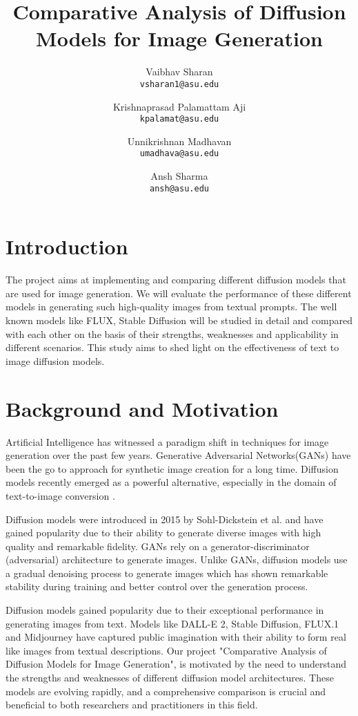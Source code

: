 \documentclass{article}
\title{Comparative Analysis of Diffusion Models for Image Generation
}
\author{
  Vaibhav Sharan\\
  \texttt{vsharan1@asu.edu} \\ 
  \and
  Krishnaprasad Palamattam Aji\\
  \texttt{kpalamat@asu.edu}\\
  \and
  Unnikrishnan Madhavan\\
  \texttt{umadhava@asu.edu}\\
  \and
  Ansh Sharma\\
  \texttt{ansh@asu.edu}
}
\begin{document}
\maketitle


\section{Introduction}
The project aims at implementing and comparing different diffusion models that are used for 
image generation. We will evaluate the performance of these different models in generating
such high-quality images from textual prompts. The well known models like FLUX, Stable
Diffusion will be studied in detail and compared with each other on the basis of
their strengths, weaknesses and applicability in different scenarios. This study aims to shed light
on the effectiveness of text to image diffusion models.


\section{Background and Motivation}
Artificial Intelligence has witnessed a paradigm shift in techniques for image generation over the past few years. 
Generative Adversarial Networks(GANs) have been the go to approach for synthetic image creation for a long time. 
Diffusion models recently emerged as a powerful alternative, especially in the domain of text-to-image conversion \cite{dhariwal2021}. 

Diffusion models were introduced in 2015 by Sohl-Dickstein et al.\cite{sohl2015} and have gained popularity 
due to their ability to generate diverse images with high quality and remarkable fidelity. GANs rely on a 
generator-discriminator (adversarial) architecture to generate images. Unlike GANs, diffusion models use a 
gradual denoising process to generate images which has shown remarkable stability during training and better control
over the generation process.

Diffusion models gained popularity due to their exceptional performance in generating images from text. Models like DALL-E 2,
Stable Diffusion, FLUX.1 and Midjourney have captured public imagination with their ability to form real like images 
from textual descriptions. Our project "Comparative Analysis of Diffusion Models for Image Generation", is motivated by the 
need to understand the strengths and weaknesses of different diffusion model architectures. These models are evolving rapidly, and a 
comprehensive comparison is crucial and beneficial to both researchers and practitioners in this field.
\end{document}
